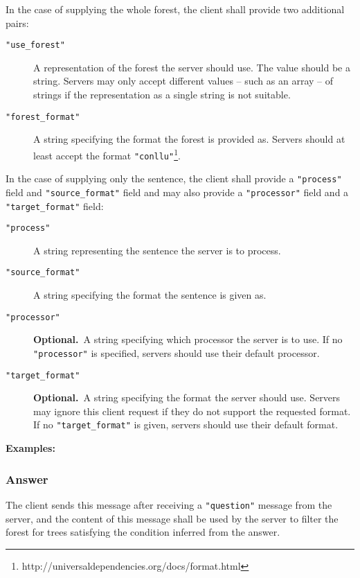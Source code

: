 \documentclass{scrartcl}
\newcommand{\jsstring}[1]{\texttt{\color{OrangeRed}"#1"}}
\newcommand{\optional}{\textbf{Optional.}}
\newcommand{\Examples}{\noindent\textbf{Examples:}}
\begin{document}
In the case of supplying the whole forest, the client shall provide two additional pairs:
\begin{description}
    \item[\jsstring{use\_forest}] A representation of the forest the server should use.
        The value should be a string.
        Servers may only accept different values – such as an array – of strings if the representation as a single string is not suitable.
    \item[\jsstring{forest\_format}] A string specifying the format the forest is provided as.
        Servers should at least accept the format \jsstring{conllu}\footnote{http://universaldependencies.org/docs/format.html}.
\end{description}
In the case of supplying only the sentence, the client shall provide a \jsstring{process} field and \jsstring{source\_format} field and may also provide a \jsstring{processor} field and a \jsstring{target\_format} field:
\begin{description}
    \item[\jsstring{process}] A string representing the sentence the server is to process.
    \item[\jsstring{source\_format}] A string specifying the format the sentence is given as.
    \item[\jsstring{processor}] \optional\ A string specifying which processor the server is to use.
        If no \jsstring{processor} is specified, servers should use their default processor.
    \item[\jsstring{target\_format}] \optional\ A string specifying the format the server should use.
        Servers may ignore this client request if they do not support the requested format.
        If no \jsstring{target\_format} is given, servers should use their default format.
\end{description}

\Examples





\subsubsection{Answer}
\label{ssub:Answer}

The client sends this message after receiving a \jsstring{question} message from the server,
and the content of this message shall be used by the server to filter the forest for trees satisfying
the condition inferred from the answer.
\end{document}
